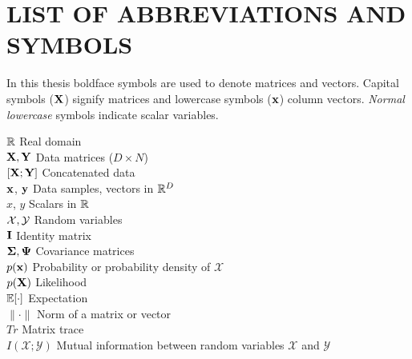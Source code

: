 \section*{LIST OF ABBREVIATIONS AND SYMBOLS}

\noindent
In this thesis boldface symbols are used to denote matrices and
vectors. Capital symbols (\(\mathbf{X}\)) signify matrices and lowercase
symbols ($\mathbf{x}$) column vectors. {\it Normal lowercase} symbols indicate
scalar variables.

\vspace{0.5cm}

\noindent
$\mathbb{R}$ \hfill Real domain\\
$\mathbf{X}, \mathbf{Y}$ \hfill Data matrices (\(D \times N\)) \\
\([\mathbf{X}; \mathbf{Y}]\) \hfill Concatenated data \\ 
$\mathbf{x}$, $\mathbf{y}$ \hfill Data samples, vectors in $\mathbb{R}^D$ \\
$x$, $y$ \hfill Scalars in $\mathbb{R}$ \\
$\mathcal{X}, \mathcal{Y}$ \hfill Random variables \\
$\mathbf{I}$ \hfill Identity matrix\\
$\boldsymbol{\Sigma}, \mathbf{\Psi}$ \hfill Covariance matrices\\
$p(\mathbf{x})$ \hfill Probability or probability density of $\mathcal{X}$ \\
\(p(\mathbf{X})\) \hfill Likelihood\\
$\mathbb{E}[\cdot]$ \hfill Expectation\\
$\|\cdot\|$ \hfill Norm of a matrix or vector \\
$Tr$ \hfill Matrix trace \\
$I(\mathcal{X};\mathcal{Y})$ \hfill Mutual information between random variables $\mathcal{X}$ and $\mathcal{Y}$ \\
